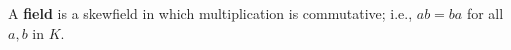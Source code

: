 A \textbf{field} is a skewfield in which multiplication is commutative; i.e., $ab = ba$ for all $a,b$ in $K$.
